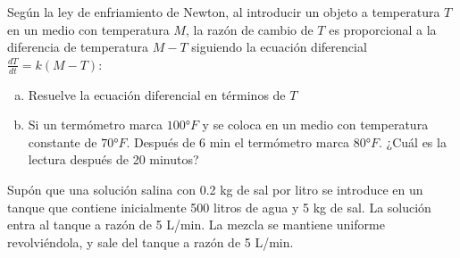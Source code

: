 \documentclass[12pt]{exam}
\begin{document}
\begin{questions}
    

     \question
     Según la ley de enfriamiento de Newton, al introducir un objeto a temperatura $T$ en un medio con temperatura $M$, la razón de cambio de $T$ es proporcional a la diferencia de temperatura $M-T$ siguiendo la ecuación diferencial $\frac{dT}{dt}=k(M-T)$:
     \begin{enumerate}[a)]
     \item	Resuelve la ecuación diferencial en términos de $T$
     \item	Si un termómetro marca $100°F$ y se coloca en un medio con temperatura constante de $70°F$.  Después de 6 min el termómetro marca $80°F$. ¿Cuál es la lectura después de 20 minutos?
     \end{enumerate}


     \question
     Supón que una solución salina con 0.2 kg de sal por litro se introduce en un tanque que contiene inicialmente 500 litros de agua y 5 kg de sal. La solución entra al tanque a razón de 5 L/min. La mezcla se mantiene uniforme revolviéndola, y sale del tanque a razón de 5 L/min.


\end{questions}
\end{document}
